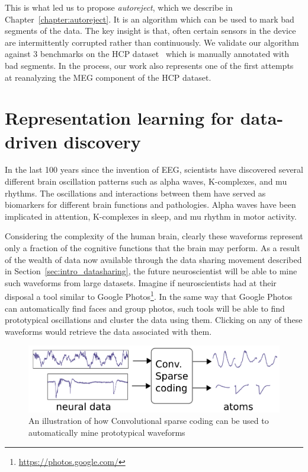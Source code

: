 This is what led us to propose \emph{autoreject}, which we describe in Chapter~\ref{chapter:autoreject}. It is an algorithm which can be used to mark bad segments of the data. The key insight is that, often certain sensors in the device are intermittently corrupted rather than continuously. We validate our algorithm against 3 benchmarks on the \ac{HCP} dataset~\citep{larson2013adding} which is manually annotated with bad segments. In the process, our work also represents one of the first attempts at reanalyzing the MEG component of the HCP dataset.

\section{Representation learning for data-driven discovery}
In the last 100 years since the invention of \ac{EEG}, scientists have discovered several different brain oscillation patterns such as alpha waves, K-complexes, and mu rhythms. The oscillations and interactions between them have served as biomarkers for different brain functions and pathologies. Alpha waves have been implicated in attention, K-complexes in sleep, and mu rhythm in motor activity. 

Considering the complexity of the human brain, clearly these waveforms represent only a fraction of the cognitive functions that the brain may perform. As a result of the wealth of data now available through the data sharing movement described in Section~\ref{sec:intro_datasharing}, the future neuroscientist will be able to mine such waveforms from large datasets. Imagine if neuroscientists had at their disposal a tool similar to Google Photos\footnote{\url{https://photos.google.com/}}. In the same way that Google Photos can automatically find faces and group photos, such tools will be able to find prototypical oscillations and cluster the data using them. Clicking on any of these waveforms would retrieve the data associated with them.

\begin{figure}[htb]
\begin{center}
   \includegraphics[width=0.7\linewidth]{figures/schema.pdf}
\end{center}
   \caption[Convolutional sparse coding]{An illustration of how Convolutional sparse coding can be used to automatically mine prototypical waveforms}
   \label{fig:neuroimaging_methods}
\end{figure}

